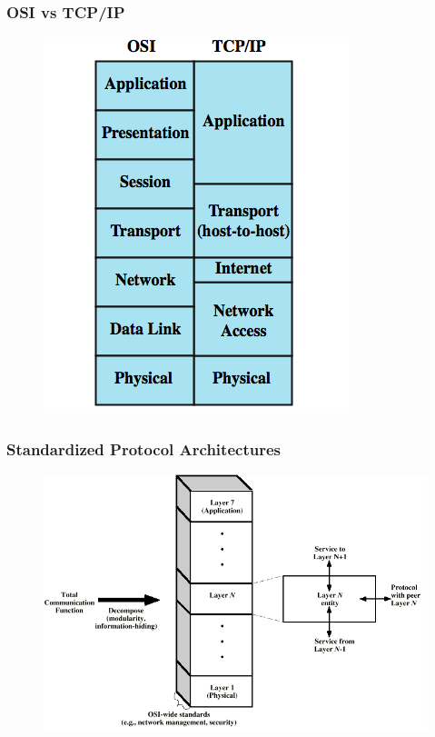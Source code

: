 \documentclass[pdflatex,compress]{beamer}
\begin{document}
\begin{frame}
	\frametitle{OSI vs TCP/IP}
	\begin{figure}
		\centering
		\includegraphics[width=0.6\textheight]{img/img09}
	\end{figure}
\end{frame}

\begin{frame}
	\frametitle{Standardized Protocol Architectures}
	\begin{figure}
		\centering
		\includegraphics[width=\textheight]{img/img10}
	\end{figure}
\end{frame}
\end{document}
